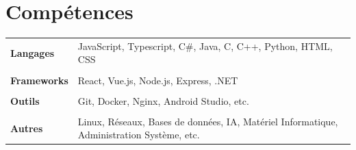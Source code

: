 \documentclass[a4paper, 12pt]{article}
\begin{document}
\begin{minipage}[t]{0.65\textwidth}

	\section*{\textcolor{sectioncolor}{Compétences}}
	\begin{tabular}{ m{} m{} }
		\textbf{Langages}   & JavaScript, Typescript, C\#, Java, C, C++, Python, HTML, CSS                              \\
		                    &                                                                                           \\
		\textbf{Frameworks} & React, Vue.js, Node.js, Express, .NET                                                     \\
		                    &                                                                                           \\
		\textbf{Outils}     & Git, Docker, Nginx, Android Studio, etc.                                                  \\
		                    &                                                                                           \\
		\textbf{Autres}     & Linux, Réseaux, Bases de données, IA, Matériel Informatique, Administration Système, etc. \\
	\end{tabular}

	\vspace{-0.4cm}


\end{minipage}
\end{document}
